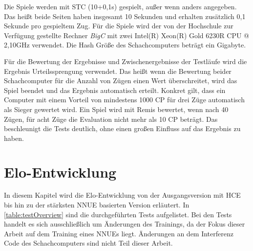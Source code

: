 Die Spiele werden mit \ac{STC} (10+0,1s) gespielt, außer wenn anders angegeben. Das heißt beide Seiten haben insgesamt 10 Sekunden und erhalten zusätzlich 0,1 Sekunde pro gespieltem Zug. Für die Spiele wird der von der Hochschule zur Verfügung gestellte Rechner \emph{BigC} mit zwei Intel(R) Xeon(R) Gold 6230R CPU @ 2,10GHz verwendet. Die Hash Größe des Schachcomputers beträgt ein Gigabyte.

Für die Bewertung der Ergebnisse und Zwischenergebnisse der Testläufe wird die Ergebnis Urteilssprengung verwendet. Das heißt wenn die Bewertung beider Schachcomputer für die Anzahl von Zügen einen Wert überschreitet, wird das Spiel beendet und das Ergebnis automatisch erteilt. Konkret gilt, dass ein Computer mit einem Vorteil von mindestens 1000 \ac{CP} für drei Züge automatisch als Sieger gewertet wird. Ein Spiel wird mit Remis bewertet, wenn nach 40 Zügen, für acht Züge die Evaluation nicht mehr als 10 \ac{CP} beträgt. Das beschleunigt die Tests deutlich, ohne einen großen Einfluss auf das Ergebnis zu haben.

\section{Elo-Entwicklung}

In diesem Kapitel wird die Elo-Entwicklung von der Ausgangsversion mit \ac{HCE} bis hin zu der stärksten \ac{NNUE} basierten Version erläutert. In \autoref{table:testOverview} sind die durchgeführten Tests aufgelistet. Bei den Tests handelt es sich ausschließlich um Änderungen des Trainings, da der Fokus dieser Arbeit auf dem Training eines \acp{NNUE} liegt. Änderungen an dem Interferenz Code des Schachcomputers sind nicht Teil dieser Arbeit.

